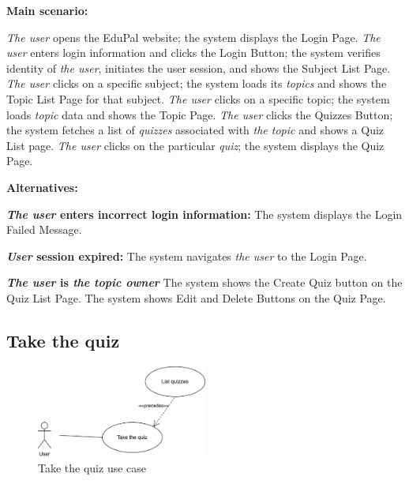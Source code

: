 \documentclass[
    english, %
]{VUMIFPSkursinis}
\begin{document}
\noindent\textbf{\fontsize{13}{15}\selectfont Main scenario:}

\textit{The user} opens the EduPal website; the system displays the Login Page. \textit{The user} enters login information and clicks the Login Button; the system verifies identity of \textit{the user}, initiates the user session, and shows the Subject List Page. \textit{The user} clicks on a specific subject; the system loads its \textit{topics} and shows the Topic List Page for that subject. \textit{The user} clicks on a specific topic; the system loads \textit{topic} data and shows the Topic Page. \textit{The user} clicks the Quizzes Button; the system fetches a list of \textit{quizzes} associated with \textit{the topic} and shows a Quiz List page. \textit{The user} clicks on the particular \textit{quiz}; the system displays the Quiz Page.

\noindent\textbf{\fontsize{13}{15}\selectfont Alternatives:}

\textbf{\textit{The user} enters incorrect login information:} The system displays the Login Failed Message.

\textbf{\textit{User} session expired:} The system navigates \textit{the user} to the Login Page.

\textbf{\textit{The user} is \textit{the topic owner}} The system shows the Create Quiz button on the Quiz List Page. The system shows Edit and Delete Buttons on the Quiz Page.

\pagebreak

\subsection{Take the quiz}

\begin{figure}[ht]
    \centering
    \includegraphics[width=0.5\textwidth]{../lab3diags/take-quiz.drawio.png}
    \caption{Take the quiz use case}
    \label{take-quiz}
\end{figure}
\end{document}
